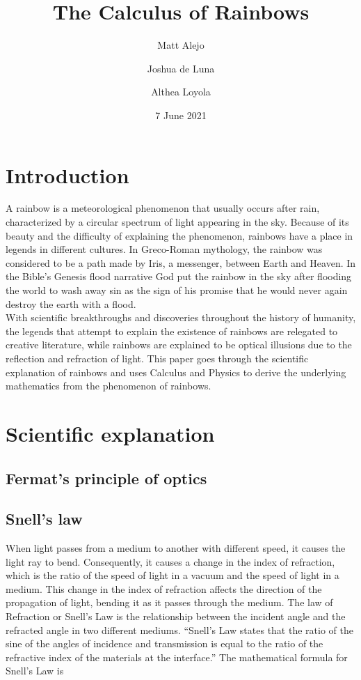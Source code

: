 \documentclass[a4paper,12pt]{article}
\title{The Calculus of Rainbows}
\author{
Matt Alejo
\and
Joshua de Luna
\and
Althea Loyola
}
\date{7 June 2021}
\begin{document}

\maketitle

\section{Introduction}

A rainbow is a meteorological phenomenon that usually occurs after rain, characterized by a circular spectrum of light appearing in the sky. Because of its beauty and the difficulty of explaining the phenomenon, rainbows have a place in legends in different cultures. In Greco-Roman mythology, the rainbow was considered to be a path made by Iris, a messenger, between Earth and Heaven. In the Bible's Genesis flood narrative God put the rainbow in the sky after flooding the world to wash away sin as the sign of his promise that he would never again destroy the earth with a flood.\\

With scientific breakthroughs and discoveries throughout the history of humanity, the legends that attempt to explain the existence of rainbows are relegated to creative literature, while rainbows are explained to be optical illusions due to the reflection and refraction of light. This paper goes through the scientific explanation of rainbows and uses Calculus and Physics to derive the underlying mathematics from the phenomenon of rainbows.

\section{Scientific explanation}

\subsection{Fermat's principle of optics}

\subsection{Snell's law}

When light passes from a medium to another with different speed, it causes the light ray to bend. Consequently, it causes a change in the index of refraction, which is the ratio of the speed of light in a vacuum and the speed of light in a medium. This change in the index of refraction affects the direction of the propagation of light, bending it as it passes through the medium.
The law of Refraction or Snell's Law is the relationship between the incident angle and the refracted angle in two different mediums. “Snell's Law states that the ratio of the sine of the angles of incidence and transmission is equal to the ratio of the refractive index of the materials at the interface.” The mathematical formula for Snell’s Law is 
\end{document}
